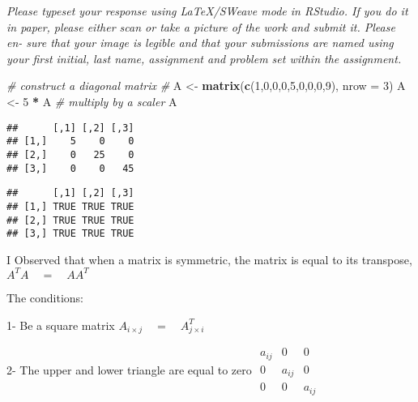 \documentclass[]{article}
\newenvironment{Shaded}{\begin{snugshade}}{\end{snugshade}}
\newcommand{\CommentTok}[1]{\textcolor[rgb]{0.56,0.35,0.01}{\textit{#1}}}
\newcommand{\DataTypeTok}[1]{\textcolor[rgb]{0.13,0.29,0.53}{#1}}
\newcommand{\DecValTok}[1]{\textcolor[rgb]{0.00,0.00,0.81}{#1}}
\newcommand{\KeywordTok}[1]{\textcolor[rgb]{0.13,0.29,0.53}{\textbf{#1}}}
\newcommand{\NormalTok}[1]{#1}
\newcommand{\OperatorTok}[1]{\textcolor[rgb]{0.81,0.36,0.00}{\textbf{#1}}}
\newcommand{\StringTok}[1]{\textcolor[rgb]{0.31,0.60,0.02}{#1}}
\begin{document}
\emph{Please typeset your response using LaTeX/SWeave mode in RStudio.
If you do it in paper, please either scan or take a picture of the work
and submit it. Please en- sure that your image is legible and that your
submissions are named using your first initial, last name, assignment
and problem set within the assignment.}

\begin{Shaded}
\begin{Highlighting}[]
\CommentTok{# construct a diagonal matrix}
\CommentTok{# }
\NormalTok{A <-}\StringTok{ }\KeywordTok{matrix}\NormalTok{(}\KeywordTok{c}\NormalTok{(}\DecValTok{1}\NormalTok{,}\DecValTok{0}\NormalTok{,}\DecValTok{0}\NormalTok{,}\DecValTok{0}\NormalTok{,}\DecValTok{5}\NormalTok{,}\DecValTok{0}\NormalTok{,}\DecValTok{0}\NormalTok{,}\DecValTok{0}\NormalTok{,}\DecValTok{9}\NormalTok{), }\DataTypeTok{nrow =} \DecValTok{3}\NormalTok{)}
\NormalTok{A <-}\StringTok{ }\DecValTok{5} \OperatorTok{*}\StringTok{ }\NormalTok{A }\CommentTok{# multiply by a scaler}
\NormalTok{A}
\end{Highlighting}
\end{Shaded}

\begin{verbatim}
##      [,1] [,2] [,3]
## [1,]    5    0    0
## [2,]    0   25    0
## [3,]    0    0   45
\end{verbatim}

\begin{Shaded}
\end{Shaded}

\begin{verbatim}
##      [,1] [,2] [,3]
## [1,] TRUE TRUE TRUE
## [2,] TRUE TRUE TRUE
## [3,] TRUE TRUE TRUE
\end{verbatim}

I Observed that when a matrix is symmetric, the matrix is equal to its
transpose, \({ A }^{ T }A\quad =\quad A{ A }^{ T }\)

The conditions:

1- Be a square matrix
\(A_{ i\times j }\quad =\quad { A }_{ j\times i }^{ T }\)

2- The upper and lower triangle are equal to zero
\(\begin{matrix} { a }_{ ij } & 0 & 0 \\ 0 & { a }_{ ij } & 0 \\ 0 & 0 & { a }_{ ij } \end{matrix}\)
\end{document}
